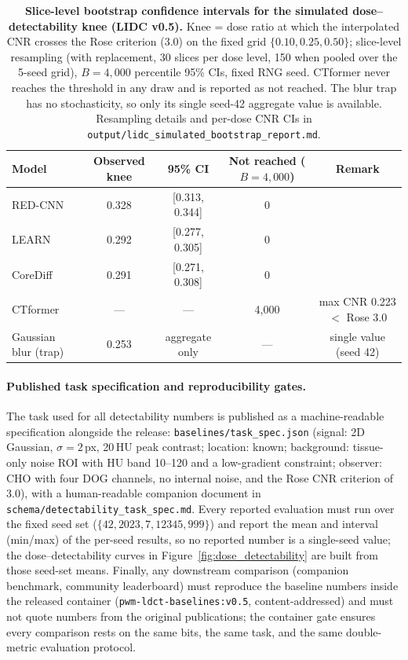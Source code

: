 \documentclass[twoside,11pt]{article}
\begin{document}
\begin{table}[ht]
    \centering
    \small
    \setlength{\tabcolsep}{4pt}
    \begin{tabular}{lcccc}
        \toprule
        \textbf{Model} & \textbf{Observed knee} & \textbf{95\% CI} & \textbf{Not reached ($B=4{,}000$)} & \textbf{Remark} \\
        \midrule
        RED-CNN  & 0.328 & [0.313, 0.344] & 0 & \\
        LEARN    & 0.292 & [0.277, 0.305] & 0 & \\
        CoreDiff & 0.291 & [0.271, 0.308] & 0 & \\
        CTformer & ---    & ---              & 4{,}000 & max CNR 0.223 $<$ Rose 3.0 \\
        Gaussian blur (trap) & 0.253 & aggregate only & --- & single value (seed 42) \\
        \bottomrule
    \end{tabular}
    \caption{\textbf{Slice-level bootstrap confidence intervals for the simulated dose--detectability knee (LIDC v0.5).} Knee = dose ratio at which the interpolated CNR crosses the Rose criterion (3.0) on the fixed grid $\{0.10, 0.25, 0.50\}$; slice-level resampling (with replacement, 30 slices per dose level, 150 when pooled over the 5-seed grid), $B=4{,}000$ percentile 95\% CIs, fixed RNG seed. CTformer never reaches the threshold in any draw and is reported as not reached. The blur trap has no stochasticity, so only its single seed-42 aggregate value is available. Resampling details and per-dose CNR CIs in \texttt{output/lidc\_simulated\_bootstrap\_report.md}.}
    \label{tab:lidc_sim_knee_ci}
\end{table}

\paragraph{Published task specification and reproducibility gates.} The task used for all detectability numbers is published as a machine-readable specification alongside the release: \texttt{baselines/task\_spec.json} (signal: 2D Gaussian, $\sigma = 2$\,px, 20\,HU peak contrast; location: known; background: tissue-only noise ROI with HU band 10--120 and a low-gradient constraint; observer: CHO with four DOG channels, no internal noise, and the Rose CNR criterion of 3.0), with a human-readable companion document in \texttt{schema/detectability\_task\_spec.md}. Every reported evaluation must run over the fixed seed set ($\{42, 2023, 7, 12345, 999\}$) and report the mean and interval (min/max) of the per-seed results, so no reported number is a single-seed value; the dose--detectability curves in Figure~\ref{fig:dose_detectability} are built from those seed-set means. Finally, any downstream comparison (companion benchmark, community leaderboard) must reproduce the baseline numbers inside the released container (\texttt{pwm-ldct-baselines:v0.5}, content-addressed) and must not quote numbers from the original publications; the container gate ensures every comparison rests on the same bits, the same task, and the same double-metric evaluation protocol.
\end{document}
